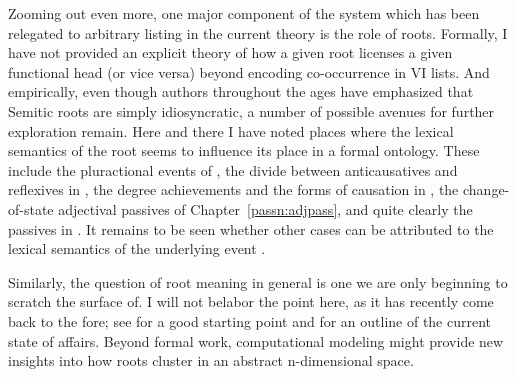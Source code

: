 \begin{exe}
\begin{xlist}
\begin{xlist}
\begin{xlist}
\begin{xlist}
\begin{xlist}
\begin{xlist}
\begin{exe}
\begin{xlist}
\begin{exe}
\begin{exe}
\begin{xlist}
\begin{exe}
\begin{exe}
\begin{xlist}
\begin{exe}
\begin{xlist}
\begin{exe}
\begin{xlist}
\begin{exe}
\begin{xlist}
\begin{exe}
\begin{xlist}
\begin{exe}
\begin{xlist}
\begin{exe}
\begin{xlist}
\begin{exe}
\begin{xlist}
\begin{exe}
\begin{xlist}
\begin{exe}
\begin{xlist}
\begin{exe}
\begin{xlist}
\label{r1:6:4}Zooming out even more, one major component of the system which has been relegated to arbitrary listing in the current theory is the role of roots. Formally, I have not provided an explicit theory of how a given root licenses a given functional head (or vice versa) beyond encoding co-occurrence in VI lists. And empirically, even though authors throughout the ages have emphasized that Semitic roots are simply idiosyncratic, a number of possible avenues for further exploration remain. Here and there I have noted places where the lexical semantics of the root seems to influence its place in a formal ontology. These include the pluractional events of {\tpie}, the divide between anticausatives and reflexives in {\thit}, the degree achievements and the forms of causation in {\thif}, the change-of-state adjectival passives of Chapter~\ref{passn:adjpass}, and quite clearly the passives in {\tnif}. It remains to be seen whether other cases can be attributed to the lexical semantics of the underlying event  \citep[114]{kastner16phd}.

Similarly, the question of root meaning in general is one we are only beginning to scratch the surface of. I will not belabor the point here, as it has recently come back to the fore; see \cite{harley14thlia} for a good starting point and \cite{kastnertucker19cup} for an outline of the current state of affairs.
Beyond formal work, computational modeling might provide new insights into how roots cluster in an abstract n-dimensional space.


\end{xlist}
\end{exe}
\end{xlist}
\end{exe}
\end{xlist}
\end{exe}
\end{xlist}
\end{exe}
\end{xlist}
\end{exe}
\end{xlist}
\end{exe}
\end{xlist}
\end{exe}
\end{xlist}
\end{exe}
\end{xlist}
\end{exe}
\end{xlist}
\end{exe}
\end{xlist}
\end{exe}
\end{exe}
\end{xlist}
\end{exe}
\end{exe}
\end{xlist}
\end{exe}
\end{xlist}
\end{xlist}
\end{xlist}
\end{xlist}
\end{xlist}
\end{xlist}
\end{exe}
